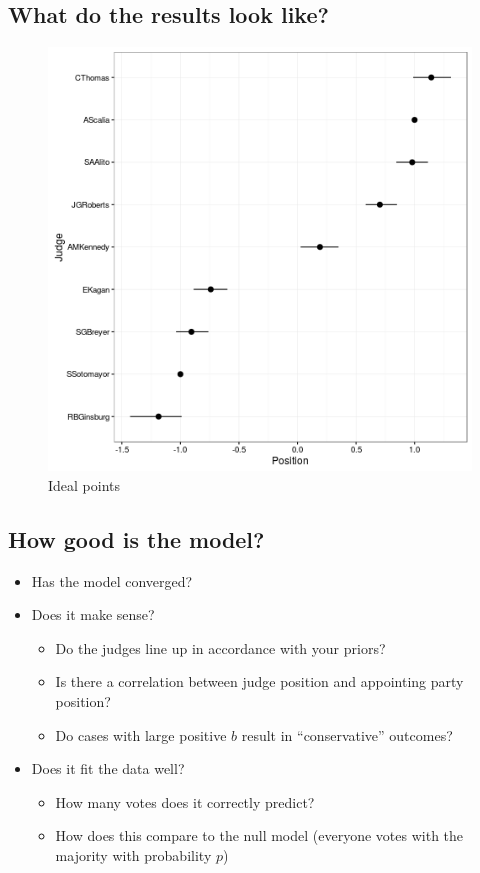 \documentclass[12pt,twoside]{article}
\providecommand{\tightlist}{%
  \setlength{\itemsep}{0pt}\setlength{\parskip}{0pt}}
\begin{document}
\subsection{What do the results look
like?}\label{what-do-the-results-look-like}

\begin{figure}[htbp]
\centering
\includegraphics{figure/plotoutcomes-1.png}
\caption{Ideal points}
\end{figure}

\subsection{How good is the model?}\label{how-good-is-the-model}

\begin{itemize}
\tightlist
\item
  Has the model converged?
\item
  Does it make sense?

  \begin{itemize}
  \tightlist
  \item
    Do the judges line up in accordance with your priors?
  \item
    Is there a correlation between judge position and appointing party
    position?
  \item
    Do cases with large positive \(b\) result in ``conservative''
    outcomes?
  \end{itemize}
\item
  Does it fit the data well?

  \begin{itemize}
  \tightlist
  \item
    How many votes does it correctly predict?
  \item
    How does this compare to the null model (everyone votes with the
    majority with probability \(p\))
  \end{itemize}
\end{itemize}
\end{document}
